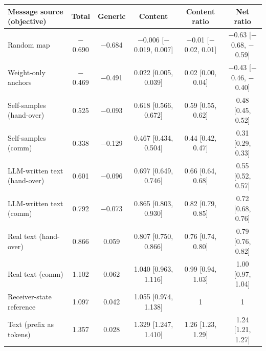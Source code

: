 \begin{tabular}{lccccc}
\toprule
Message source (objective) & Total & Generic & Content & Content ratio & Net ratio \\
\midrule
Random map & $-$0.690 & $-$0.684 & $-$0.006 [$-$0.019, 0.007] & $-$0.01 [$-$0.02, 0.01] & $-$0.63 [$-$0.68, $-$0.59] \\
Weight-only anchors & $-$0.469 & $-$0.491 & 0.022 [0.005, 0.039] & 0.02 [0.00, 0.04] & $-$0.43 [$-$0.46, $-$0.40] \\
\midrule
Self-samples (hand-over) & 0.525 & $-$0.093 & 0.618 [0.566, 0.672] & 0.59 [0.55, 0.62] & 0.48 [0.45, 0.52] \\
Self-samples (comm) & 0.338 & $-$0.129 & 0.467 [0.434, 0.504] & 0.44 [0.42, 0.47] & 0.31 [0.29, 0.33] \\
LLM-written text (hand-over) & 0.601 & $-$0.096 & 0.697 [0.649, 0.746] & 0.66 [0.64, 0.68] & 0.55 [0.52, 0.57] \\
LLM-written text (comm) & 0.792 & $-$0.073 & 0.865 [0.803, 0.930] & 0.82 [0.79, 0.85] & 0.72 [0.68, 0.76] \\
Real text (hand-over) & 0.866 & 0.059 & 0.807 [0.750, 0.866] & 0.76 [0.74, 0.80] & 0.79 [0.76, 0.82] \\
Real text (comm) & 1.102 & 0.062 & 1.040 [0.963, 1.116] & 0.99 [0.94, 1.03] & 1.00 [0.97, 1.04] \\
\midrule
Receiver-state reference & 1.097 & 0.042 & 1.055 [0.974, 1.138] & 1 & 1 \\
Text (prefix as tokens) & 1.357 & 0.028 & 1.329 [1.247, 1.410] & 1.26 [1.23, 1.29] & 1.24 [1.21, 1.27] \\
\bottomrule
\end{tabular}
